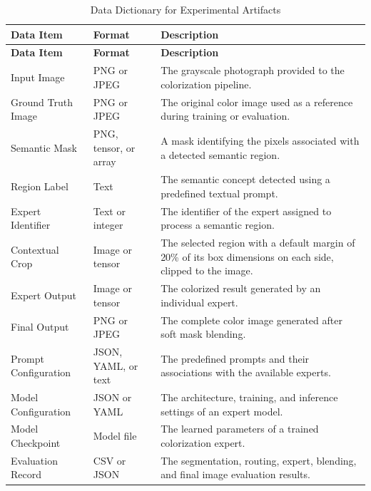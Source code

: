 \documentclass{FastFyp}
\begin{document}
\begin{longtable}{|p{3.2cm}|p{3.0cm}|p{7.4cm}|}
\caption{Data Dictionary for Experimental Artifacts}
\label{tab:data-dictionary}\\
\hline
\textbf{Data Item} & \textbf{Format} & \textbf{Description} \\ \hline
\endfirsthead

\hline
\textbf{Data Item} & \textbf{Format} & \textbf{Description} \\ \hline
\endhead

Input Image &
PNG or JPEG &
The grayscale photograph provided to the colorization pipeline. \\ \hline

Ground Truth Image &
PNG or JPEG &
The original color image used as a reference during training or evaluation. \\ \hline

Semantic Mask &
PNG, tensor, or array &
A mask identifying the pixels associated with a detected semantic region. \\ \hline

Region Label &
Text &
The semantic concept detected using a predefined textual prompt. \\ \hline

Expert Identifier &
Text or integer &
The identifier of the expert assigned to process a semantic region. \\ \hline

Contextual Crop &
Image or tensor &
The selected region with a default margin of 20\% of its box dimensions on each side, clipped to the image. \\ \hline

Expert Output &
Image or tensor &
The colorized result generated by an individual expert. \\ \hline

Final Output &
PNG or JPEG &
The complete color image generated after soft mask blending. \\ \hline

Prompt Configuration &
JSON, YAML, or text &
The predefined prompts and their associations with the available experts. \\ \hline

Model Configuration &
JSON or YAML &
The architecture, training, and inference settings of an expert model. \\ \hline

Model Checkpoint &
Model file &
The learned parameters of a trained colorization expert. \\ \hline

Evaluation Record &
CSV or JSON &
The segmentation, routing, expert, blending, and final image evaluation results. \\ \hline

\end{longtable}
\end{document}
